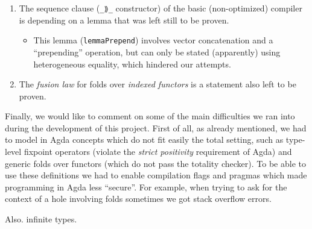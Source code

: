 \documentclass[a4paper]{article}
\begin{document}
        \begin{enumerate}
            \item The sequence clause (\texttt{\_⟫\_} constructor) of the basic (non-optimized) compiler
                is depending on a lemma that was left still to be proven.
                \begin{itemize}
                    \item This lemma (\texttt{lemmaPrepend}) involves vector concatenation and a ``prepending'' operation,
                        but can only be stated (apparently) using heterogeneous equality, which hindered our attempts.
                \end{itemize}

            \item The \emph{fusion law} for folds over \emph{indexed functors} is a statement also left
                to be proven.
        \end{enumerate}

        Finally, we would like to comment on some of the main difficulties we ran into during the
        development of this project. First of all, as already mentioned, we had to model in Agda concepts which
        do not fit easily the total setting, such as type-level fixpoint operators (violate the
        \emph{strict positivity} requirement of Agda) and generic folds over functors (which do not pass
        the totality checker). To be able to use these definitions we had to enable compilation flags and pragmas
        which made programming in Agda less ``secure''. For example, when trying to ask for the context of
        a hole involving folds sometimes we got stack overflow errors.

        Also. infinite types.



    
    
\end{document}
